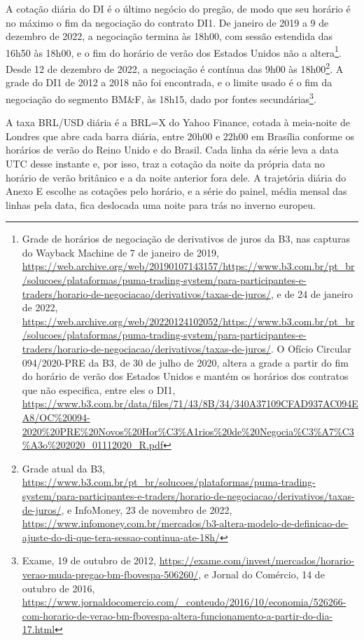 \documentclass[preprint,authoryear,review,12pt]{elsarticle}
\begin{document}
A cotação diária do DI é o último negócio do pregão, de modo que seu horário é no máximo o fim da negociação do contrato DI1. De janeiro de 2019 a 9 de dezembro de 2022, a negociação termina às 18h00, com sessão estendida das 16h50 às 18h00, e o fim do horário de verão dos Estados Unidos não a altera\footnote{Grade de horários de negociação de derivativos de juros da B3, nas capturas do Wayback Machine de 7 de janeiro de 2019, \url{https://web.archive.org/web/20190107143157/https://www.b3.com.br/pt_br/solucoes/plataformas/puma-trading-system/para-participantes-e-traders/horario-de-negociacao/derivativos/taxas-de-juros/}, e de 24 de janeiro de 2022, \url{https://web.archive.org/web/20220124102052/https://www.b3.com.br/pt_br/solucoes/plataformas/puma-trading-system/para-participantes-e-traders/horario-de-negociacao/derivativos/taxas-de-juros/}. O Ofício Circular 094/2020-PRE da B3, de 30 de julho de 2020, altera a grade a partir do fim do horário de verão dos Estados Unidos e mantém os horários dos contratos que não especifica, entre eles o DI1, \url{https://www.b3.com.br/data/files/71/43/8B/34/340A37109CFAD937AC094EA8/OC\%20094-2020\%20PRE\%20Novos\%20Hor\%C3\%A1rios\%20de\%20Negocia\%C3\%A7\%C3\%A3o\%202020_01112020_R.pdf}}. Desde 12 de dezembro de 2022, a negociação é contínua das 9h00 às 18h00\footnote{Grade atual da B3, \url{https://www.b3.com.br/pt_br/solucoes/plataformas/puma-trading-system/para-participantes-e-traders/horario-de-negociacao/derivativos/taxas-de-juros/}, e InfoMoney, 23 de novembro de 2022, \url{https://www.infomoney.com.br/mercados/b3-altera-modelo-de-definicao-de-ajuste-do-di-que-tera-sessao-continua-ate-18h/}}. A grade do DI1 de 2012 a 2018 não foi encontrada, e o limite usado é o fim da negociação do segmento BM\&F, às 18h15, dado por fontes secundárias\footnote{Exame, 19 de outubro de 2012, \url{https://exame.com/invest/mercados/horario-verao-muda-pregao-bm-fbovespa-506260/}, e Jornal do Comércio, 14 de outubro de 2016, \url{https://www.jornaldocomercio.com/_conteudo/2016/10/economia/526266-com-horario-de-verao-bm-fbovespa-altera-funcionamento-a-partir-do-dia-17.html}}.

A taxa BRL/USD diária é a BRL=X do Yahoo Finance, cotada à meia-noite de Londres que abre cada barra diária, entre 20h00 e 22h00 em Brasília conforme os horários de verão do Reino Unido e do Brasil. Cada linha da série leva a data UTC desse instante e, por isso, traz a cotação da noite da própria data no horário de verão britânico e a da noite anterior fora dele. A trajetória diária do Anexo E escolhe as cotações pelo horário, e a série do painel, média mensal das linhas pela data, fica deslocada uma noite para trás no inverno europeu.
\end{document}
